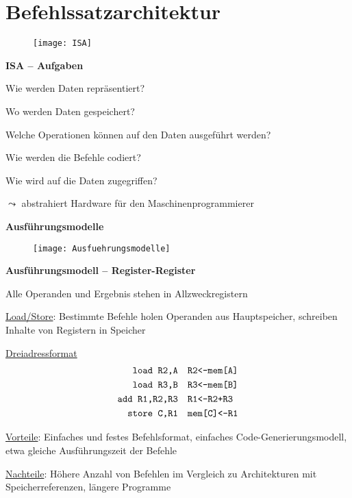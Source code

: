 \section{Befehlssatzarchitektur}
\label{sec:befehlssatzarchitektur}

\begin{figure}[ht]
  \centering
  \texttt{[image: ISA]}
  \label{ISA}
\end{figure}

\textbf{ISA -- Aufgaben}
\begin{items}
	\item Wie werden Daten repräsentiert?
	\item Wo werden Daten gespeichert?
	\item Welche Operationen können auf den Daten ausgeführt werden?
	\item Wie werden die Befehle codiert?
	\item Wie wird auf die Daten zugegriffen?
	\item $\leadsto$ abstrahiert Hardware für den Maschinenprogrammierer
\end{items}

\textbf{Ausführungsmodelle}
\begin{figure}[ht]
  \centering
  \texttt{[image: Ausfuehrungsmodelle]}
  \label{Ausfuehrungsmodelle}
\end{figure}

\textbf{Ausführungsmodell -- Register-Register}
\begin{items}
	\item Alle Operanden und Ergebnis stehen in Allzweckregistern
	\item \underline{Load/Store}: Bestimmte Befehle holen Operanden aus Hauptspeicher, schreiben Inhalte von Registern in Speicher
	\item \underline{Dreiadressformat}
	\begin{align*}
		\text{\code{load R2,A}} &\quad \text{\code{R2<-mem[A]}} \\
		\text{\code{load R3,B}} &\quad \text{\code{R3<-mem[B]}} \\
		\text{\code{add R1,R2,R3}} &\quad \text{\code{R1<-R2+R3}} \\
		\text{\code{store C,R1}} &\quad \text{\code{mem[C]<-R1}}
	\end{align*}
	\item \underline{Vorteile}: Einfaches und festes Befehlsformat, einfaches Code-Generierungsmodell, etwa gleiche Ausführungszeit der Befehle
	\item \underline{Nachteile}: Höhere Anzahl von Befehlen im Vergleich zu Architekturen mit Speicherreferenzen, längere Programme
\end{items}

